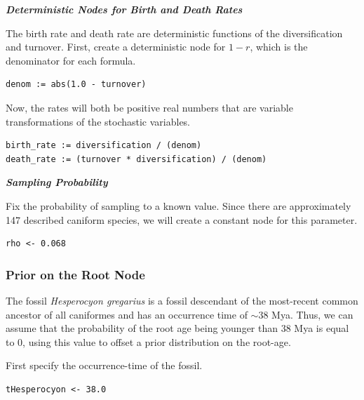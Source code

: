 \textbf{\textit{Deterministic Nodes for Birth and Death Rates}}

The birth rate and death rate are deterministic functions of the diversification and turnover.
First, create a deterministic node for $1 - r$, which is the denominator for each formula.

{\tt \begin{snugshade*}
\begin{lstlisting}
denom := abs(1.0 - turnover) 
\end{lstlisting}
\end{snugshade*}}

Now, the rates will both be positive real numbers that are variable transformations of the stochastic variables.
{\tt \begin{snugshade*}
\begin{lstlisting}
birth_rate := diversification / (denom)
death_rate := (turnover * diversification) / (denom)
\end{lstlisting}
\end{snugshade*}}

\textbf{\textit{Sampling Probability}}

Fix the probability of sampling to a known value. Since there are approximately 147 described caniform species, we will create a constant node for this parameter.
{\tt \begin{snugshade*}
\begin{lstlisting}
rho <- 0.068
\end{lstlisting}
\end{snugshade*}}

\subsubsection{Prior on the Root Node}

The fossil \textit{Hesperocyon gregarius} is a fossil descendant of the most-recent common ancestor of all caniformes and has an occurrence time of $\sim$38 Mya.
Thus, we can assume that the probability of the root age being younger than 38 Mya is equal to 0, using this value to offset a prior distribution on the root-age.

First specify the occurrence-time of the fossil.
{\tt \begin{snugshade*}
\begin{lstlisting}
tHesperocyon <- 38.0
\end{lstlisting}
\end{snugshade*}}

